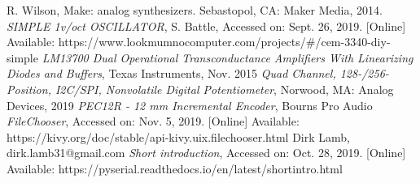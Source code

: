 \documentclass[letterpaper, 12 pt, conference]{ieeeconf}
\begin{document}


\begin{thebibliography}{99}

 R. Wilson, Make: analog synthesizers. Sebastopol, CA: Maker Media, 2014.
 \textit{SIMPLE 1v/oct OSCILLATOR}, S. Battle, Accessed on: Sept. 26, 2019. [Online] Available: https://www.lookmumnocomputer.com/projects/\#/cem-3340-diy-simple
 \textit{LM13700 Dual Operational Transconductance Amplifiers With Linearizing Diodes and Buffers}, Texas Instruments, Nov. 2015
 \textit{Quad Channel, 128-/256-Position, I2C/SPI, Nonvolatile Digital Potentiometer}, Norwood, MA: Analog Devices, 2019
 \textit{PEC12R - 12 mm Incremental Encoder}, Bourns Pro Audio
 \textit{FileChooser}, Accessed on: Nov. 5, 2019. [Online] Available: https://kivy.org/doc/stable/api-kivy.uix.filechooser.html
 Dirk Lamb, dirk.lamb31@gmail.com
 \textit{Short introduction}, Accessed on: Oct. 28, 2019. [Online] Available: https://pyserial.readthedocs.io/en/latest/shortintro.html


\end{thebibliography}
\end{document}

